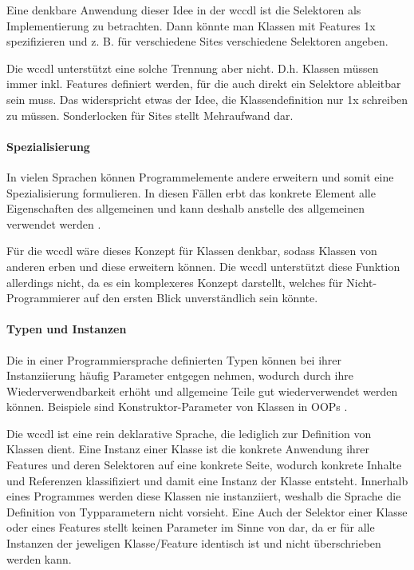     Eine denkbare Anwendung dieser Idee in der \gls{wccdl} ist die Selektoren als
    Implementierung zu betrachten. Dann könnte man Klassen mit Features 1x spezifizieren
    und z. B. für verschiedene Sites verschiedene Selektoren angeben.

    Die \gls{wccdl} unterstützt eine solche Trennung aber nicht.
    D.h. Klassen müssen immer inkl. Features definiert werden, für die auch direkt ein Selektore
    ableitbar sein muss.
    Das widerspricht etwas der Idee, die Klassendefinition nur 1x schreiben zu müssen.
    Sonderlocken für Sites stellt Mehraufwand dar. %

    \paragraph{Spezialisierung}
    In vielen Sprachen können Programmelemente andere erweitern und somit eine Spezialisierung formulieren.
    In diesen Fällen erbt das konkrete Element alle Eigenschaften des allgemeinen
    und kann deshalb anstelle des allgemeinen verwendet werden
    \cite[Kapitel 5.1.4]{voelter:DslEngineering}.

    Für die \gls{wccdl} wäre dieses Konzept für Klassen denkbar,
    sodass Klassen von anderen erben und diese erweitern können.
    Die \gls{wccdl} unterstützt diese Funktion allerdings nicht,
    da es ein komplexeres Konzept darstellt, welches für Nicht-Programmierer
    auf den ersten Blick unverständlich sein könnte.

    \paragraph{Typen und Instanzen}
    Die in einer Programmiersprache definierten Typen können bei ihrer Instanziierung
    häufig Parameter entgegen nehmen, wodurch durch ihre Wiederverwendbarkeit erhöht
    und allgemeine Teile gut wiederverwendet werden können.
    Beispiele sind Konstruktor-Parameter von Klassen in OOPs
    \cite[Kapitel 5.1.5]{voelter:DslEngineering}.

    Die \gls{wccdl} ist eine rein deklarative Sprache,
    die lediglich zur Definition von Klassen dient.
    Eine Instanz einer Klasse ist die konkrete Anwendung ihrer Features und
    deren Selektoren auf eine konkrete Seite,
    wodurch konkrete Inhalte und Referenzen klassifiziert und damit eine Instanz
    der Klasse entsteht.
    Innerhalb eines Programmes werden diese Klassen nie instanziiert,
    weshalb die Sprache die Definition von Typparametern nicht vorsieht.
    Eine 
    Auch der Selektor einer Klasse oder eines Features stellt keinen Parameter im
    Sinne von \cite[Kapitel 5.1.5]{voelter:DslEngineering} dar,
    da er für alle Instanzen der jeweligen Klasse/Feature identisch ist und nicht
    überschrieben werden kann.

